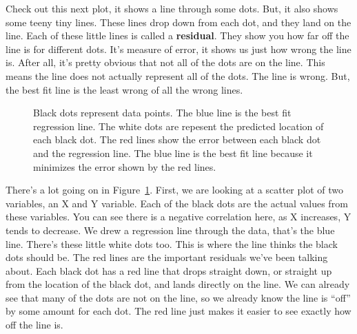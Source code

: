 \documentclass[
  letterpaper,
  DIV=11,
  numbers=noendperiod]{scrreprt}
\begin{document}
Check out this next plot, it shows a line through some dots. But, it
also shows some teeny tiny lines. These lines drop down from each dot,
and they land on the line. Each of these little lines is called a
\textbf{residual}. They show you how far off the line is for different
dots. It's measure of error, it shows us just how wrong the line is.
After all, it's pretty obvious that not all of the dots are on the line.
This means the line does not actually represent all of the dots. The
line is wrong. But, the best fit line is the least wrong of all the
wrong lines.

\begin{figure}


\caption{\label{fig-3regressionResiduals}Black dots represent data
points. The blue line is the best fit regression line. The white dots
are repesent the predicted location of each black dot. The red lines
show the error between each black dot and the regression line. The blue
line is the best fit line because it minimizes the error shown by the
red lines.}

\end{figure}%

There's a lot going on in Figure~\ref{fig-3regressionResiduals}. First,
we are looking at a scatter plot of two variables, an X and Y variable.
Each of the black dots are the actual values from these variables. You
can see there is a negative correlation here, as X increases, Y tends to
decrease. We drew a regression line through the data, that's the blue
line. There's these little white dots too. This is where the line thinks
the black dots should be. The red lines are the important residuals
we've been talking about. Each black dot has a red line that drops
straight down, or straight up from the location of the black dot, and
lands directly on the line. We can already see that many of the dots are
not on the line, so we already know the line is ``off'' by some amount
for each dot. The red line just makes it easier to see exactly how off
the line is.
\end{document}
